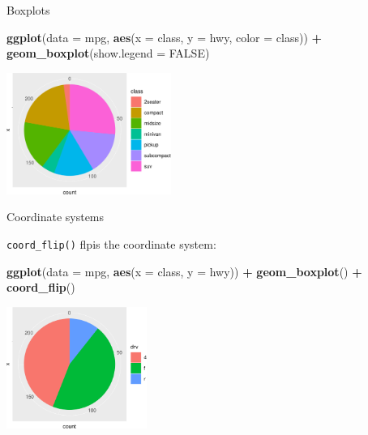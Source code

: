 \documentclass[ignorenonframetext,]{beamer}
\newenvironment{Shaded}{\begin{snugshade}}{\end{snugshade}}
\newcommand{\DataTypeTok}[1]{\textcolor[rgb]{0.13,0.29,0.53}{#1}}
\newcommand{\KeywordTok}[1]{\textcolor[rgb]{0.13,0.29,0.53}{\textbf{#1}}}
\newcommand{\NormalTok}[1]{#1}
\newcommand{\OperatorTok}[1]{\textcolor[rgb]{0.81,0.36,0.00}{\textbf{#1}}}
\newcommand{\OtherTok}[1]{\textcolor[rgb]{0.56,0.35,0.01}{#1}}
\newcommand{\StringTok}[1]{\textcolor[rgb]{0.31,0.60,0.02}{#1}}
\begin{document}
\begin{frame}[fragile]{Boxplots}
\protect\hypertarget{boxplots-5}{}

\begin{Shaded}
\begin{Highlighting}[]
\KeywordTok{ggplot}\NormalTok{(}\DataTypeTok{data =}\NormalTok{ mpg, }
       \KeywordTok{aes}\NormalTok{(}\DataTypeTok{x =}\NormalTok{ class, }\DataTypeTok{y =}\NormalTok{ hwy, }\DataTypeTok{color =}\NormalTok{ class)) }\OperatorTok{+}\StringTok{ }
\StringTok{  }\KeywordTok{geom_boxplot}\NormalTok{(}\DataTypeTok{show.legend =} \OtherTok{FALSE}\NormalTok{)}
\end{Highlighting}
\end{Shaded}

\begin{center}\includegraphics[height=150px]{data-visualization_files/figure-beamer/unnamed-chunk-144-1} \end{center}

\end{frame}

\begin{frame}[fragile]{Coordinate systems}
\protect\hypertarget{coordinate-systems}{}

\texttt{coord\_flip()} flpis the coordinate system:

\begin{Shaded}
\begin{Highlighting}[]
\KeywordTok{ggplot}\NormalTok{(}\DataTypeTok{data =}\NormalTok{ mpg, }\KeywordTok{aes}\NormalTok{(}\DataTypeTok{x =}\NormalTok{ class, }\DataTypeTok{y =}\NormalTok{ hwy)) }\OperatorTok{+}\StringTok{ }
\StringTok{  }\KeywordTok{geom_boxplot}\NormalTok{() }\OperatorTok{+}
\StringTok{  }\KeywordTok{coord_flip}\NormalTok{()}
\end{Highlighting}
\end{Shaded}

\begin{center}\includegraphics[height=150px]{data-visualization_files/figure-beamer/unnamed-chunk-145-1} \end{center}

\end{frame}
\end{document}
